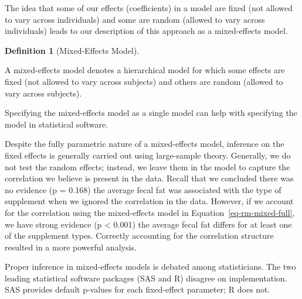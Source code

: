 \documentclass[
  letterpaper,
  DIV=11,
  numbers=noendperiod]{scrreprt}
\theoremstyle{definition}
\theoremstyle{definition}
\newtheorem{definition}{Definition}[chapter]
\theoremstyle{remark}
\begin{document}
The idea that some of our effects (coefficients) in a model are fixed
(not allowed to vary across individuals) and some are random (allowed to
vary across individuals) leads to our description of this approach as a
mixed-effects model.

\begin{definition}[Mixed-Effects
Model]\protect\hypertarget{def-mixed-effects-model}{}\label{def-mixed-effects-model}

A mixed-effects model denotes a hierarchical model for which some
effects are fixed (not allowed to vary across subjects) and others are
random (allowed to vary across subjects).

\end{definition}

\begin{tcolorbox}[enhanced jigsaw, bottomrule=.15mm, titlerule=0mm, bottomtitle=1mm, colback=white, coltitle=black, rightrule=.15mm, leftrule=.75mm, toprule=.15mm, toptitle=1mm, left=2mm, opacityback=0, colframe=quarto-callout-note-color-frame, breakable, title=\textcolor{quarto-callout-note-color}{\faInfo}\hspace{0.5em}{Note}, arc=.35mm, colbacktitle=quarto-callout-note-color!10!white, opacitybacktitle=0.6]

Specifying the mixed-effects model as a single model can help with
specifying the model in statistical software.

\end{tcolorbox}

Despite the fully parametric nature of a mixed-effects model, inference
on the fixed effects is generally carried out using large-sample theory.
Generally, we do not test the random effects; instead, we leave them in
the model to capture the correlation we believe is present in the data.
Recall that we concluded there was no evidence (p = 0.168) the average
fecal fat was associated with the type of supplement when we ignored the
correlation in the data. However, if we account for the correlation
using the mixed-effects model in Equation~\ref{eq-rm-mixed-full}, we
have strong evidence (p \textless{} 0.001) the average fecal fat differs
for at least one of the supplement types. Correctly accounting for the
correlation structure resulted in a more powerful analysis.

\begin{tcolorbox}[enhanced jigsaw, bottomrule=.15mm, titlerule=0mm, bottomtitle=1mm, colback=white, coltitle=black, rightrule=.15mm, leftrule=.75mm, toprule=.15mm, toptitle=1mm, left=2mm, opacityback=0, colframe=quarto-callout-warning-color-frame, breakable, title=\textcolor{quarto-callout-warning-color}{\faExclamationTriangle}\hspace{0.5em}{Warning}, arc=.35mm, colbacktitle=quarto-callout-warning-color!10!white, opacitybacktitle=0.6]

Proper inference in mixed-effects models is debated among statisticians.
The two leading statistical software packages (SAS and R) disagree on
implementation. SAS provides default p-values for each fixed-effect
parameter; R does not.

\end{tcolorbox}
\end{document}
